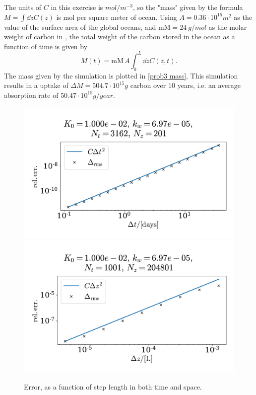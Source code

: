 \documentclass{article}
\begin{document}
    The units of $C$ in this exercise is $\si{mol / m^{-3}}$, so the "mass" given by the formula $M = \int \dd z C(z)$ is mol per square meter of ocean. Using $A = 0.36 \cdot 10^{15}\si{m^2}$ as the value of the surface area of the global oceans, and $\mathrm{mM} = \SI{24}{g / mol}$ as the molar weight of carbon in , the total weight of the carbon stored in the ocean as a function of time is given by
    \begin{equation*}
        M(t) = \mathrm{mM} \, A \int_0^L \dd z C(z, t).
    \end{equation*}
    The mass given by the simulation is plotted in \autoref{prob3 mass}. This simulation results in a uptake of $\Delta M = 504.7 \cdot 10^{15} \si{g}$ carbon over 10 years, i.e. an average absorption rate of $50.47 \cdot 10^{15} \si{g/year}$. 


    \begin{figure}
        \centering
        \includegraphics[width=.49\textwidth]{../plots/prob3_conv_test_t}
        \includegraphics[width=.49\textwidth]{../plots/prob3_conv_test_z}
        \caption{Error, as a function of step length in both time and space.}
        \label{prob3 conv}
    \end{figure}
\end{document}
